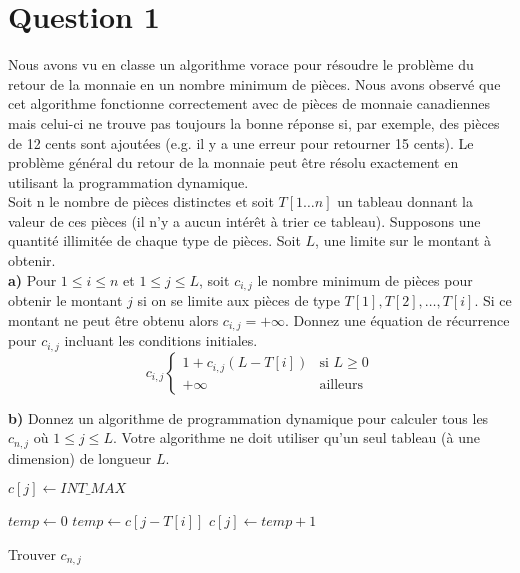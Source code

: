 \documentclass[devoir3.tex]{subfiles}
\begin{document}
\section*{Question 1}
Nous avons vu en classe un algorithme vorace pour résoudre le problème du retour de la monnaie en un nombre minimum de pièces. Nous avons observé que cet algorithme fonctionne correctement avec de pièces de monnaie canadiennes mais celui-ci ne trouve pas toujours la bonne réponse si, par exemple, des pièces de 12 cents sont ajoutées (e.g. il y a une erreur pour retourner 15 cents). Le problème général du retour de la monnaie peut être résolu exactement en utilisant la programmation dynamique. \\[0.2cm]
Soit n le nombre de pièces distinctes et soit \(T[1 \dots n]\) un tableau donnant la valeur de ces pièces (il n’y a aucun intérêt à trier ce tableau). Supposons une quantité illimitée de chaque type de pièces. Soit \(L\), une limite sur le montant à obtenir. \\

\textbf{a)} Pour \(1 \leq i \leq n\) et \(1 \leq j \leq L\), soit \(c_{i,j}\) le nombre minimum de pièces pour obtenir le montant \(j\) si on se limite aux pièces de type \(T[1], T[2], \dots , T[i]\). Si ce montant ne peut être obtenu alors \(c_{i,j} = +\infty \). Donnez une équation de récurrence pour \(c_{i,j}\) incluant les conditions initiales. \\

\[c_{i,j} \begin{cases}
      1+c_{i,j}(L-T[i]) & \text{si } L \geq 0 \\
      +\infty & \text{ailleurs }
   \end{cases}
\]

\newpage

\textbf{b)} Donnez un algorithme de programmation dynamique pour calculer tous les \(c_{n,j}\) où \(1 \leq j \leq L\). Votre algorithme ne doit utiliser qu’un seul tableau (à une dimension) de longueur \(L\). \\

\begin{algorithm}[H]


    {
    	\( c[j] \gets INT\_ MAX \)
    }
         
    {
    	{
    		{
				{
					\(temp \gets 0\)
				}
				\Else
				{
					\(temp \gets c[j-T[i]]\)
				}
				{
					\(c[j] \gets temp + 1\) 
				}
    		}
    	}
    }   

      \caption{Trouver \(c_{n,j}\)} 
\end{algorithm}
\end{document}
